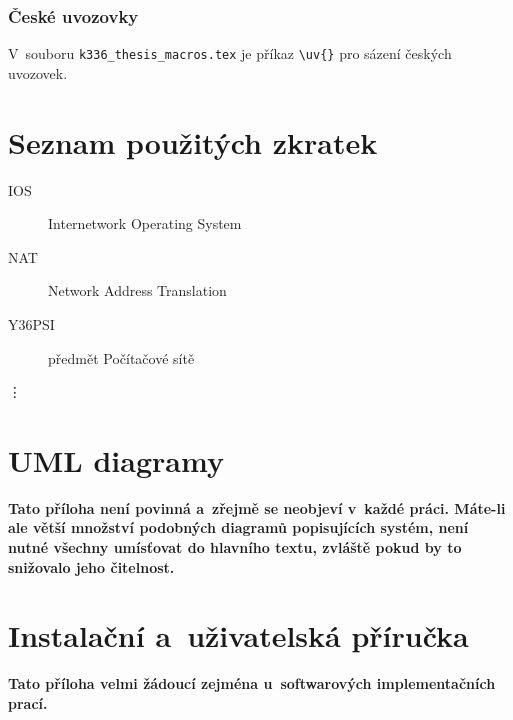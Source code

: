 \documentclass[11pt,twoside,a4paper]{book}
\begin{document}
\subsection{České uvozovky}
V~souboru \verb|k336_thesis_macros.tex| je příkaz \verb|\uv{}| pro sázení českých uvozovek. 


\chapter{Seznam použitých zkratek}

\begin{description}
\item[IOS] Internetwork Operating System
\item[NAT] Network Address Translation
\item[Y36PSI] předmět Počítačové sítě
\end{description}
\vdots

\chapter{UML diagramy}
\textbf{\large Tato příloha není povinná a~zřejmě se neobjeví v~každé práci. Máte-li ale větší množství podobných
diagramů popisujících systém, není nutné všechny umísťovat do hlavního textu, zvláště pokud by to snižovalo jeho
čitelnost.}

\chapter{Instalační a~uživatelská příručka}
\textbf{\large Tato příloha velmi žádoucí zejména u~softwarových implementačních prací.}
\end{document}
